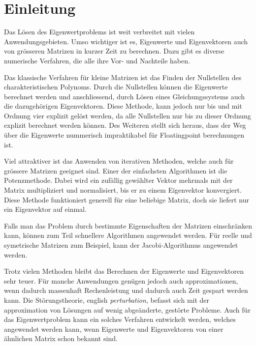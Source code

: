 %
%
%
\section{Einleitung\label{ew:section:einleitung}}

Das Lösen des Eigenwertproblems ist  weit verbreitet mit vielen Anwendungsgebieten.
Umso wichtiger ist es, Eigenwerte und Eigenvektoren auch von grösseren Matrizen in kurzer Zeit zu berechnen.
Dazu gibt es diverse numerische Verfahren, die alle ihre Vor- und Nachteile haben.

Das klassische Verfahren für kleine Matrizen ist das Finden der Nullstellen des charakteristischen Polynoms.
Durch die Nullstellen können die Eigenwerte berechnet werden und anschliessend, durch Lösen eines Gleichungssystems auch die dazugehörigen Eigenvektoren.
Diese Methode, kann jedoch nur bis und mit Ordnung vier explizit gelöst werden, da alle Nullstellen nur bis zu dieser Ordnung explizit berechnet werden können.
Des Weiteren stellt sich heraus, dass der Weg über die Eigenwerte nummerisch impraktikabel für Floatingpoint berechnungen ist. 

Viel attraktiver ist das Anwenden von iterativen Methoden, welche auch für grössere Matrizen geeignet sind.
Einer der einfachsten Algorithmen ist die Potenzmethode.
Dabei wird ein zufällig gewählter Vektor mehrmals mit der Matrix multipliziert und normalisiert, bis er zu einem Eigenvektor konvergiert.
Diese Methode funktioniert generell für eine beliebige Matrix, doch sie liefert nur ein Eigenvektor auf einmal.

Falls man das Problem durch bestimmte Eigenschaften der Matrizen einschränken kann, können zum Teil schnellere Algorithmen angewendet werden.
Für reelle und symetrische Matrizen zum Beispiel, kann der Jacobi-Algorithmus angewendet werden. %

Trotz vielen Methoden bleibt das Berechnen der Eigenwerte und Eigenvektoren sehr teuer.
Für manche Anwendungen genügen jedoch auch approximationen, wenn dadurch massenhaft Rechenleistung und dadurch auch Zeit gespart werden kann.
Die Störungstheorie, english \textit{perturbation}, befasst sich mit der approximation von Lösungen auf wenig abgeänderte, gestörte Probleme.
Auch für das Eigenwertproblem kann ein solches Verfahren entwickelt werden, welches angewendet werden kann, wenn Eigenwerte und Eigenvektoren von einer ähnlichen Matrix schon bekannt sind.
